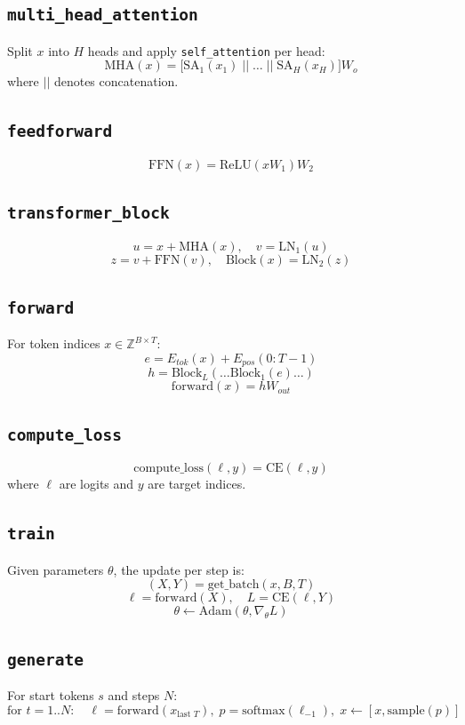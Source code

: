 \documentclass{article}
\begin{document}
\subsection*{\texttt{multi\_head\_attention}}
Split $x$ into $H$ heads and apply \texttt{self\_attention} per head:
\[
\mathrm{MHA}(x) = \big[\mathrm{SA}_1(x_1) \; || \; \dots \; || \; \mathrm{SA}_H(x_H)\big] W_o
\]
where $||$ denotes concatenation.

\subsection*{\texttt{feedforward}}
\[
\mathrm{FFN}(x) = \mathrm{ReLU}(x W_1) W_2
\]

\subsection*{\texttt{transformer\_block}}
\[
u = x + \mathrm{MHA}(x), \quad v = \mathrm{LN}_1(u)
\]
\[
z = v + \mathrm{FFN}(v), \quad \mathrm{Block}(x) = \mathrm{LN}_2(z)
\]

\subsection*{\texttt{forward}}
For token indices $x \in \mathbb{Z}^{B \times T}$:
\[
e = E_{tok}(x) + E_{pos}(0{:}T-1)
\]
\[
h = \mathrm{Block}_L(\dots \mathrm{Block}_1(e)\dots)
\]
\[
\mathrm{forward}(x) = h W_{out}
\]

\subsection*{\texttt{compute\_loss}}
\[
\mathrm{compute\_loss}(\ell, y) = \mathrm{CE}(\ell, y)
\]
where $\ell$ are logits and $y$ are target indices.

\subsection*{\texttt{train}}
Given parameters $\theta$, the update per step is:
\[
(X, Y) = \mathrm{get\_batch}(x, B, T)
\]
\[
\ell = \mathrm{forward}(X), \quad L = \mathrm{CE}(\ell, Y)
\]
\[
\theta \leftarrow \mathrm{Adam}(\theta, \nabla_\theta L)
\]

\subsection*{\texttt{generate}}
For start tokens $s$ and steps $N$:
\[
\text{for } t=1..N: \quad \ell = \mathrm{forward}(x_{\text{last }T}),\; p = \mathrm{softmax}(\ell_{-1}),\; x \leftarrow [x, \mathrm{sample}(p)]
\]
\end{document}
